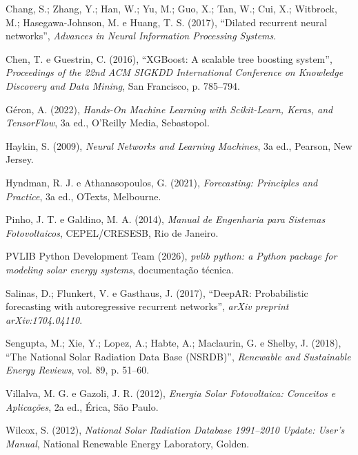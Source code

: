 \documentclass[12pt,a4paper]{article}
\begin{document}
\vspace{6pt}

\noindent Chang, S.; Zhang, Y.; Han, W.; Yu, M.; Guo, X.; Tan, W.; Cui, X.; Witbrock, M.; Hasegawa-Johnson, M. e Huang, T. S. (2017), ``Dilated recurrent neural networks'', \textit{Advances in Neural Information Processing Systems}.

\vspace{6pt}

\noindent Chen, T. e Guestrin, C. (2016), ``XGBoost: A scalable tree boosting system'', \textit{Proceedings of the 22nd ACM SIGKDD International Conference on Knowledge Discovery and Data Mining}, San Francisco, p. 785--794.

\vspace{6pt}

\noindent Géron, A. (2022), \textit{Hands-On Machine Learning with Scikit-Learn, Keras, and TensorFlow}, 3a ed., O'Reilly Media, Sebastopol.

\vspace{6pt}

\noindent Haykin, S. (2009), \textit{Neural Networks and Learning Machines}, 3a ed., Pearson, New Jersey.

\vspace{6pt}

\noindent Hyndman, R. J. e Athanasopoulos, G. (2021), \textit{Forecasting: Principles and Practice}, 3a ed., OTexts, Melbourne.

\vspace{6pt}

\noindent Pinho, J. T. e Galdino, M. A. (2014), \textit{Manual de Engenharia para Sistemas Fotovoltaicos}, CEPEL/CRESESB, Rio de Janeiro.

\vspace{6pt}

\noindent PVLIB Python Development Team (2026), \textit{pvlib python: a Python package for modeling solar energy systems}, documentação técnica.

\vspace{6pt}

\noindent Salinas, D.; Flunkert, V. e Gasthaus, J. (2017), ``DeepAR: Probabilistic forecasting with autoregressive recurrent networks'', \textit{arXiv preprint arXiv:1704.04110}.

\vspace{6pt}

\noindent Sengupta, M.; Xie, Y.; Lopez, A.; Habte, A.; Maclaurin, G. e Shelby, J. (2018), ``The National Solar Radiation Data Base (NSRDB)'', \textit{Renewable and Sustainable Energy Reviews}, vol. 89, p. 51--60.

\vspace{6pt}

\noindent Villalva, M. G. e Gazoli, J. R. (2012), \textit{Energia Solar Fotovoltaica: Conceitos e Aplicações}, 2a ed., Érica, São Paulo.

\vspace{6pt}

\noindent Wilcox, S. (2012), \textit{National Solar Radiation Database 1991--2010 Update: User's Manual}, National Renewable Energy Laboratory, Golden.
\end{document}
